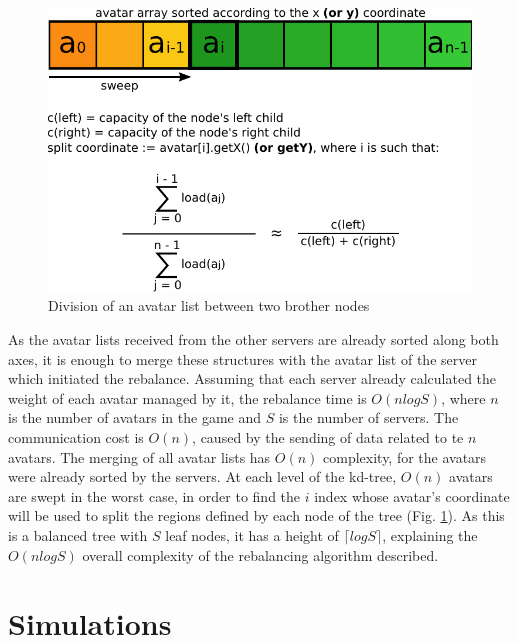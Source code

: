\documentclass[acmjacm]{acmtrans2m}
\newcommand{\figurecaption}{Fig.}
\begin{document}
\begin{figure}
  \centering
  \includegraphics[width=0.8\linewidth]{images/balancenode}
  \caption{Division of an avatar list between two brother nodes}
   \label{fig:balancenode}
\end{figure}

As the avatar lists received from the other servers are already sorted along both axes, it is enough to merge these structures with the avatar list of the server which initiated the rebalance. Assuming that each server already calculated the weight of each avatar managed by it, the rebalance time is  $O(nlogS)$, where $n$ is the number of avatars in the game and $S$ is the number of servers. The communication cost is $O(n)$, caused by the sending of data related to te $n$ avatars. The merging of all avatar lists has $O(n)$ complexity, for the avatars were already sorted by the servers. At each level of the kd-tree, $O(n)$ avatars are swept in the worst case, in order to find the $i$ index whose avatar's coordinate will be used to split the regions defined by each node of the tree (\figurecaption{} \ref{fig:balancenode}). As this is a balanced tree with $S$ leaf nodes, it has a height of $\lceil logS \rceil$, explaining the $O(nlogS)$ overall complexity of the rebalancing algorithm described.

\section{Simulations}
\label{sec:simul}
\end{document}
